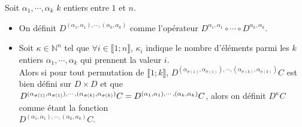 \begin{definition}
\noindent Soit $\alpha_1, \cdots , \alpha_k$ $k$ entiers entre $1$ et $n$.\\
\begin{itemize}  
\item On définit $D^{(\alpha_1, \alpha_1), \cdots, (\alpha_k, \alpha_k)}$ comme l'opérateur $D^{\alpha_1, \alpha_1} \circ \cdots \circ D^{\alpha_k, \alpha_k}$.\\

\item Soit $\kappa \in \mathbb{N}^n$ tel que $\forall i \in \llbracket 1;n \rrbracket$, $\kappa_i$ indique
  le nombre d'éléments parmi les $k$ entiers $\alpha_1, \cdots , \alpha_k$ qui prennent la valeur $i$.\\
  
\noindent Alors si pour tout permutation de $\llbracket 1;k \rrbracket$, $D^{(\alpha_{\sigma(1)}, \alpha_{\sigma(1)}), \cdots, (\alpha_{\sigma(k)}, \alpha_{\sigma(k)})}C$
  est bien défini sur $D \times D$ et que $D^{(\alpha_{\sigma(1)}, \alpha_{\sigma(1)}), \cdots, (\alpha_{\sigma(k)}, \alpha_{\sigma(k)})}C = \\D^{(\alpha_1, \alpha_1), \cdots, (\alpha_k, \alpha_k)}C$,
  alors on définit $D^{\kappa}C$ comme étant la fonction \\$D^{(\alpha_1, \alpha_1), \cdots, (\alpha_k, \alpha_k)}C$.
\end{itemize}
\end{definition}


